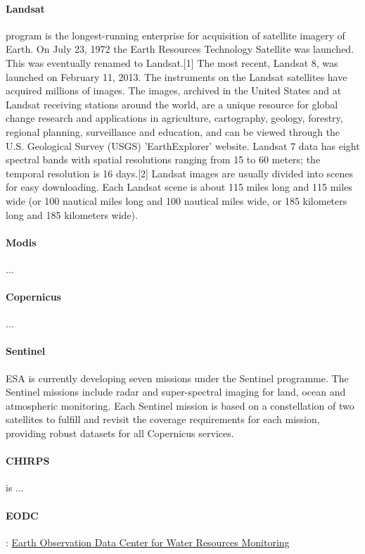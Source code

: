 \paragraph{Landsat} program is the longest-running enterprise for acquisition of satellite imagery of Earth. On July 23, 1972 the Earth Resources Technology Satellite was launched. This was eventually renamed to Landsat.[1] The most recent, Landsat 8, was launched on February 11, 2013. The instruments on the Landsat satellites have acquired millions of images. The images, archived in the United States and at Landsat receiving stations around the world, are a unique resource for global change research and applications in agriculture, cartography, geology, forestry, regional planning, surveillance and education, and can be viewed through the U.S. Geological Survey (USGS) 'EarthExplorer' website. Landsat 7 data has eight spectral bands with spatial resolutions ranging from 15 to 60 meters; the temporal resolution is 16 days.[2] Landsat images are usually divided into scenes for easy downloading. Each Landsat scene is about 115 miles long and 115 miles wide (or 100 nautical miles long and 100 nautical miles wide, or 185 kilometers long and 185 kilometers wide).

\paragraph{Modis} ...

\paragraph{Copernicus} ...

\paragraph{Sentinel} ESA is currently developing seven missions under the Sentinel programme. The Sentinel missions include radar and super-spectral imaging for land, ocean and atmospheric monitoring. Each Sentinel mission is based on a constellation of two satellites to fulfill and revisit the coverage requirements for each mission, providing robust datasets for all Copernicus services.

\paragraph{CHIRPS} is ...

\paragraph{EODC}: \href{https://www.eodc.eu/}{Earth Observation Data Center for Water Resources Monitoring}

